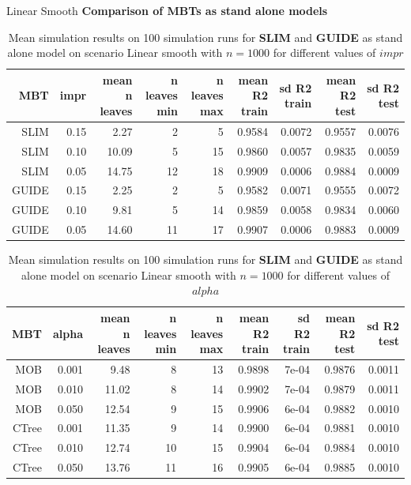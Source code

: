 \documentclass[9pt, xcolor=table]{beamer}
\begin{document}
\begin{frame}{Linear Smooth}
\textbf{Comparison of MBTs as stand alone models}
\begin{table}
\caption{Mean simulation results on 100 simulation runs for \textbf{SLIM} and \textbf{GUIDE} as stand alone model on scenario Linear smooth with $n = 1000$ for different values of $impr$}
\centering \tiny
\begin{tabular}[t]{r|r|r|r|r|r|r|r|r}
\hline
MBT & impr & mean n leaves & n leaves min & n leaves max & mean R2 train & sd R2 train & mean R2 test & sd R2 test\\
\hline
SLIM & 0.15 & 2.27 & 2 & 5 & 0.9584 & 0.0072 & 0.9557 & 0.0076\\
\hline
SLIM & 0.10 & 10.09 & 5 & 15 & 0.9860 & 0.0057 & 0.9835 & 0.0059\\
\hline
SLIM & 0.05 & 14.75 & 12 & 18 & 0.9909 & 0.0006 & 0.9884 & 0.0009\\
\hline
GUIDE & 0.15 & 2.25 & 2 & 5 & 0.9582 & 0.0071 & 0.9555 & 0.0072\\
\hline
GUIDE & 0.10 & 9.81 & 5 & 14 & 0.9859 & 0.0058 & 0.9834 & 0.0060\\
\hline
GUIDE & 0.05 & 14.60 & 11 & 17 & 0.9907 & 0.0006 & 0.9883 & 0.0009\\
\hline
\end{tabular}
\end{table}

\begin{table}

\caption{Mean simulation results on 100 simulation runs for \textbf{SLIM} and \textbf{GUIDE} as stand alone model on scenario Linear smooth with $n = 1000$ for different values of $alpha$}
\centering \tiny
\begin{tabular}[t]{r|r|r|r|r|r|r|r|r}
\hline
MBT & alpha & mean n leaves & n leaves min & n leaves max & mean R2 train & sd R2 train & mean R2 test & sd R2 test\\
\hline
MOB & 0.001 & 9.48 & 8 & 13 & 0.9898 & 7e-04 & 0.9876 & 0.0011\\
\hline
MOB & 0.010 & 11.02 & 8 & 14 & 0.9902 & 7e-04 & 0.9879 & 0.0011\\
\hline
MOB & 0.050 & 12.54 & 9 & 15 & 0.9906 & 6e-04 & 0.9882 & 0.0010\\
\hline
CTree & 0.001 & 11.35 & 9 & 14 & 0.9900 & 6e-04 & 0.9881 & 0.0010\\
\hline
CTree & 0.010 & 12.74 & 10 & 15 & 0.9904 & 6e-04 & 0.9884 & 0.0010\\
\hline
CTree & 0.050 & 13.76 & 11 & 16 & 0.9905 & 6e-04 & 0.9885 & 0.0010\\
\hline
\end{tabular}
\end{table}

    
\end{frame}
\end{document}

